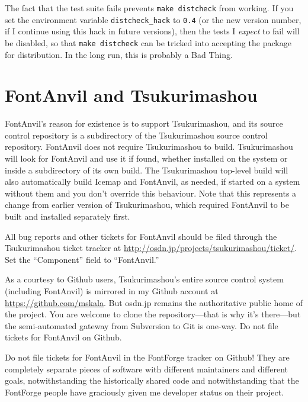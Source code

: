 The fact that the test suite fails prevents \texttt{make distcheck} from
working.  If you set the environment variable \texttt{distcheck\_hack} to
\texttt{0.4} (or the new version number, if I continue using this hack in
future versions), then the tests I \emph{expect} to fail will be disabled,
so that \texttt{make distcheck} can be tricked into accepting the package
for distribution.  In the long run, this is probably a Bad Thing.

\section{FontAnvil and Tsukurimashou}

FontAnvil's reason for existence is to support Tsukurimashou, and its source
control repository is a subdirectory of the Tsukurimashou source control
repository.  FontAnvil does not require Tsukurimashou to build. 
Tsukurimashou will look for FontAnvil and use it if found, whether installed
on the system or inside a subdirectory of its own build.  The Tsukurimashou
top-level build will also automatically build Icemap and FontAnvil, as
needed, if started on a system without them and you don't override this
behaviour.  Note that this represents a change from earlier version of
Tsukurimashou, which required FontAnvil to be built and installed separately
first.

All bug reports and other tickets for FontAnvil should be filed through
the Tsukurimashou ticket tracker at
\url{http://osdn.jp/projects/tsukurimashou/ticket/}.  Set the
``Component'' field to ``FontAnvil.''

As a courtesy to Github users, Tsukurimashou's entire source control system
(including FontAnvil) is mirrored in my Github account at
\url{https://github.com/mskala}.  But osdn.jp remains the
authoritative public home of the project.  You are welcome to clone the
repository---that is why it's there---but the semi-automated gateway from
Subversion to Git is one-way.  Do not file tickets for FontAnvil on Github.

Do not file tickets for FontAnvil in the FontForge tracker on Github!  They
are completely separate pieces of software with different maintainers and
different goals, notwithstanding the historically shared code and
notwithstanding that the FontForge people have graciously given me developer
status on their project.

\clearpage
